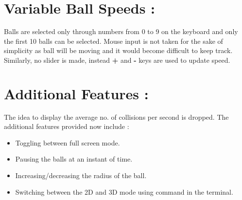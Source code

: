 \documentclass[]{article}
\begin{document}
\section{\LARGE Variable Ball Speeds :}
\Large Balls are selected only through numbers from 0 to 9 on the keyboard and only the first 10 balls can be selected. Mouse input is not taken for the sake of simplicity as ball will be moving and it would become difficult to keep track. Similarly, no slider is made, instead \textbf{+} and \textbf{-} keys are used to update speed.  

\section{\LARGE Additional Features :}
\Large The idea to display the average no. of collisions per second is dropped. The additional features provided now include : 
\begin{itemize}
	\item Toggling between full screen mode.
	\item Pausing the balls at an instant of time.
	\item Increasing/decreasing the radius of the ball.
	\item Switching between the 2D and 3D mode using command in the terminal.
	
\end{itemize}
\end{document}
